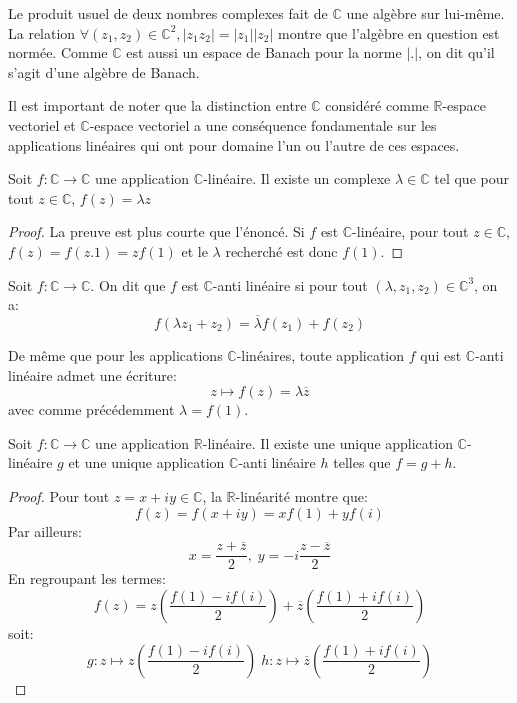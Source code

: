 \begin{rem}
Le produit usuel de deux nombres complexes fait de $ \mathbb{C}$ une
algèbre sur lui-même. La relation $\forall (z_1,z_2) \in \mathbb{C}^2,
|z_1 z_2| = |z_1||z_2|$ montre que l'algèbre en question est
normée. Comme $\mathbb{C}$ est aussi un espace de Banach pour la norme
$|.|$, on dit qu'il s'agit d'une algèbre de Banach.
\end{rem}
Il est important de noter que la distinction entre $\mathbb{C}$ considéré comme
$\mathbb{R}$-espace vectoriel et $\mathbb{C}$-espace vectoriel a une conséquence
fondamentale sur les applications linéaires qui ont pour domaine l'un ou l'autre
de ces espaces.
\begin{fprop}
Soit $f \colon \mathbb{C} \to \mathbb{C}$ une application $\mathbb{C}$-linéaire.
Il existe un complexe $\lambda \in \mathbb{C}$ tel que pour tout $z \in
\mathbb{C}$, $f(z) = \lambda z$
\end{fprop}
\begin{proof}
La preuve est plus courte que l'énoncé. Si $f$ est $\mathbb{C}$-linéaire, pour
tout $z \in \mathbb{C}$, $f(z) = f(z.1)= z f(1)$ et le $\lambda$ recherché est
donc $f(1)$.
\end{proof}
\begin{fdefn}
Soit $f \colon \mathbb{C} \to \mathbb{C}$. On dit que $f$ est $\mathbb{C}$-anti
linéaire si pour tout $(\lambda,z_1,z_2) \in \mathbb{C}^3$, on a:
\[
f(\lambda z_1 + z_2) = \overline{\lambda} f(z_1) + f(z_2)
\]
\end{fdefn}
De même que pour les applications $\mathbb{C}$-linéaires, toute application $f$
qui est $\mathbb{C}$-anti linéaire admet une écriture:
\[
z \mapsto f(z) = \lambda \overline{z}
\]
avec comme précédemment $\lambda = f(1)$.
\begin{fprop}\label{prop:dec_lin}
Soit $f \colon \mathbb{C} \to \mathbb{C}$ une application 
$\mathbb{R}$-linéaire. Il existe une unique application $\mathbb{C}$-linéaire
$g$ et une unique application $\mathbb{C}$-anti linéaire $h$ telles que $f = g
+ h$.
\end{fprop}
\begin{proof}
Pour tout $z=x + i y \in \mathbb{C}$, la $\mathbb{R}$-linéarité montre que:
\[
f(z) = f(x + iy) = x f(1) + y f(i)
\]
Par ailleurs:
\[
x = \frac{z + \overline{z}}{2}, \; y = -i \frac{z - \overline{z}}{2}
\]
En regroupant les termes:
\[
f(z) = z \left(\frac{f(1)-if(i)}{2}\right) + \overline{z}
\left(\frac{f(1)+if(i)}{2}\right)
\]
soit:
\[
g \colon z \mapsto  z \left(\frac{f(1)-if(i)}{2}\right) \; h \colon z \mapsto \overline{z}
\left(\frac{f(1)+if(i)}{2}\right)
\]
\end{proof}

